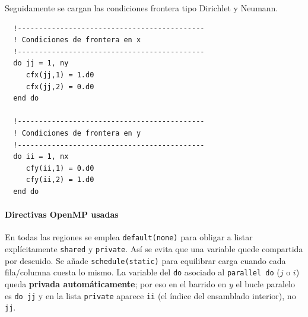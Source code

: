 \documentclass[11pt,a4paper]{article}
\begin{document}
Seguidamente se cargan las condiciones frontera tipo Dirichlet y Neumann.

\begin{verbatim}
  !--------------------------------------------
  ! Condiciones de frontera en x
  !--------------------------------------------
  do jj = 1, ny
     cfx(jj,1) = 1.d0
     cfx(jj,2) = 0.d0
  end do

  !--------------------------------------------
  ! Condiciones de frontera en y
  !--------------------------------------------
  do ii = 1, nx
     cfy(ii,1) = 0.d0
     cfy(ii,2) = 1.d0
  end do
\end{verbatim}


\paragraph{Directivas OpenMP usadas}

\medskip

En todas las regiones se emplea \texttt{default(none)} para obligar a listar
expl\'icitamente \texttt{shared} y \texttt{private}. As\'i se evita que una
variable quede compartida por descuido. Se a\~nade \texttt{schedule(static)} para equilibrar
carga cuando cada fila/columna cuesta lo mismo. La variable del \texttt{do}
asociado al \texttt{parallel do} ($j$ o $i$)
queda \textbf{privada autom\'aticamente}; por eso en el barrido en $y$ el bucle
paralelo es \texttt{do jj} y en la lista \texttt{private} aparece \texttt{ii}
(el \'indice del ensamblado interior), no \texttt{jj}.

\medskip
\end{document}

